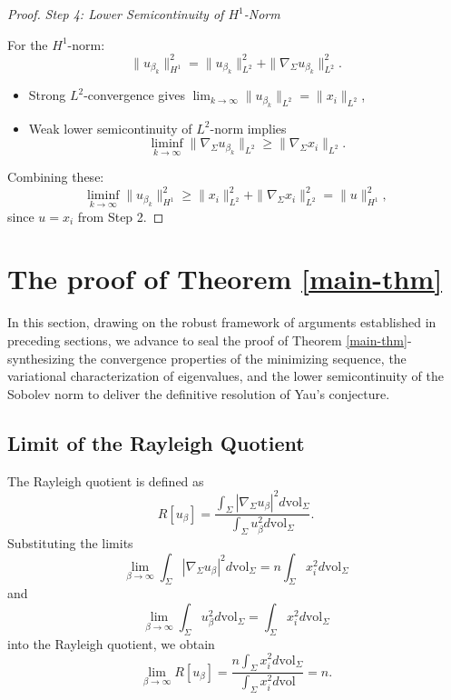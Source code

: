 \documentclass[a4, 12pt]{amsart}
\numberwithin{equation}{section} \numberwithin{equation}{section}
\begin{document}
\begin{proof}
\textit{Step 4: Lower Semicontinuity of $H^1$-Norm}

For the $H^1$-norm:
\begin{equation*}
\|u_{\beta_k}\|_{H^1}^2 = \|u_{\beta_k}\|_{L^2}^2 + \|\nabla_\Sigma u_{\beta_k}\|_{L^2}^2.
\end{equation*}
\begin{itemize}\item[(i)]   Strong $L^2$-convergence gives $\lim_{k \to \infty} \|u_{\beta_k}\|_{L^2} = \|x_i\|_{L^2}$,
\item[(ii)]   Weak lower semicontinuity of $L^2$-norm implies \begin{equation*}\liminf_{k \to \infty} \|\nabla_\Sigma u_{\beta_k}\|_{L^2} \geq \|\nabla_\Sigma x_i\|_{L^2}.\end{equation*}
\end{itemize}
Combining these:
\begin{equation*}
\liminf_{k \to \infty} \|u_{\beta_k}\|_{H^1}^2 \geq \|x_i\|_{L^2}^2 + \|\nabla_\Sigma x_i\|_{L^2}^2 = \|u\|_{H^1}^2,
\end{equation*}
since $u = x_i$ from Step 2.
\end{proof}



\section{The proof of Theorem \ref{main-thm}}\label{The proof of Theorem}
In this section, drawing on the robust framework of arguments established in preceding sections, we advance to seal the proof of Theorem \ref{main-thm}-synthesizing the convergence properties of the minimizing sequence, the variational characterization of eigenvalues, and the lower semicontinuity of the Sobolev norm to deliver the definitive resolution of Yau's conjecture.
\subsection{Limit of the Rayleigh Quotient}

The Rayleigh quotient is defined as
\begin{equation*}R\left[u_{\beta}\right]=\frac{\int_{\Sigma}\left|\nabla_{\Sigma} u_{\beta}\right|^{2} d \mathrm{vol}_{\Sigma}}{\int_{\Sigma} u_{\beta}^{2} d \mathrm{vol}_{\Sigma}}.\end{equation*} Substituting the limits
\begin{equation*}\lim _{\beta \rightarrow \infty} \int_{\Sigma}\left|\nabla_{\Sigma} u_{\beta}\right|^{2} d \mathrm{vol}_{\Sigma}=n \int_{\Sigma} x_{i}^{2} d \mathrm{vol}_{\Sigma}\end{equation*} and
\begin{equation*}\lim _{\beta \rightarrow \infty} \int_{\Sigma} u_{\beta}^{2} d \mathrm{vol}_{\Sigma}=\int_{\Sigma} x_{i}^{2} d \mathrm{vol}_{\Sigma}\end{equation*} into the Rayleigh quotient, we obtain
\begin{equation*}
\lim _{\beta \rightarrow \infty} R\left[u_{\beta}\right]=\frac{n \int_{\Sigma} x_{i}^{2} d \mathrm{vol}_{\Sigma}}{\int_{\Sigma} x_{i}^{2} d \mathrm{vol}}=n.
\end{equation*}
\end{document}
